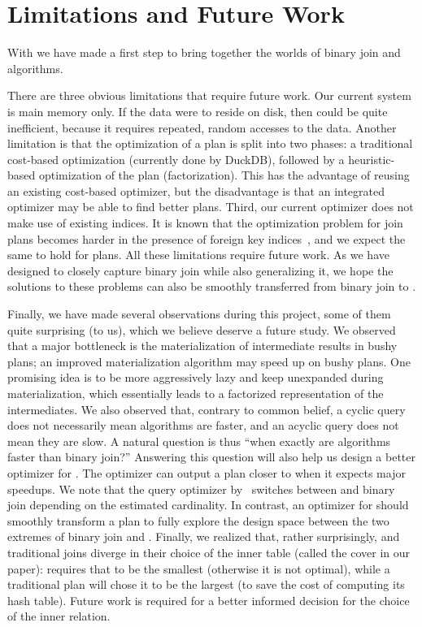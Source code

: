 \section{Limitations and Future Work}\label{sec:discussion}

With \FJ we have made a first step to bring together 
the worlds of binary join and \WCOJ algorithms.

There are three obvious limitations that require future work.  Our
current system is main memory only.  If the data were to reside on
disk, then \COLT could be quite inefficient, because it requires
repeated, random accesses to the data.  Another limitation is that the
optimization of a \FJ plan is split into two phases: a
traditional cost-based optimization (currently done by DuckDB),
followed by a heuristic-based optimization of the \FJ plan
(factorization).  This has the advantage of reusing an existing
cost-based optimizer, but the disadvantage is that an integrated
optimizer may be able to find better plans.  Third, our current
optimizer does not make use of existing indices.  It is known that the
optimization problem for join plans becomes harder in the presence of
foreign key indices~\cite{DBLP:journals/pvldb/LeisGMBK015}, and we
expect the same to hold for \FJ plans.  All these limitations require
future work.  As we have designed \FJ to closely capture binary join
while also generalizing it, we hope the solutions to these problems
can also be smoothly transferred from binary join to \FJ.

Finally, we have made several observations during this project, some
of them quite surprising (to us), which we believe deserve a future
study.  We observed that a major bottleneck is the materialization of
intermediate results in bushy plans; an improved materialization
algorithm may speed up \FJ on bushy plans.  One promising idea is to
be more aggressively lazy and keep \COLTs unexpanded during
materialization, which essentially leads to a factorized
representation of the intermediates.  We also observed that, contrary
to common belief, a cyclic query does not necessarily mean \WCOJ
algorithms are faster, and an acyclic query does not mean they are
slow.  A natural question is thus ``when exactly are \WCOJ algorithms
faster than binary join?''  Answering this question will also help us
design a better optimizer for \FJ.  The optimizer can output a plan
closer to \WCOJ when it expects major speedups.  We note that the
query optimizer by~\cite{DBLP:journals/pvldb/FreitagBSKN20} switches
between \GJ and binary join depending on the estimated cardinality.
In contrast, an optimizer for \FJ should smoothly transform a \FJ plan
to fully explore the design space between the two extremes of binary
join and \GJ.  Finally, we realized that, rather surprisingly, \GJ and
traditional joins diverge in their choice of the inner table (called
the cover in our paper): \GJ requires that to be the smallest
(otherwise it is not optimal), while a traditional plan will chose it
to be the largest (to save the cost of computing its hash table).
Future work is required for a better informed decision for the choice
of the inner relation.


